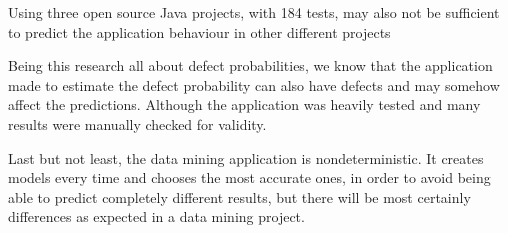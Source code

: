 Using three open source Java projects, with 184 tests, may also not be sufficient to predict the application behaviour in other different projects

Being this research all about defect probabilities, we know that the application made to estimate the defect probability can also have defects and may somehow affect the predictions. Although the application was heavily tested and many results were manually checked for validity.

Last but not least, the data mining application is nondeterministic. It creates models every time and chooses the most accurate ones, in order to avoid being able to predict completely different results, but there will be most certainly differences as expected in a data mining project.







